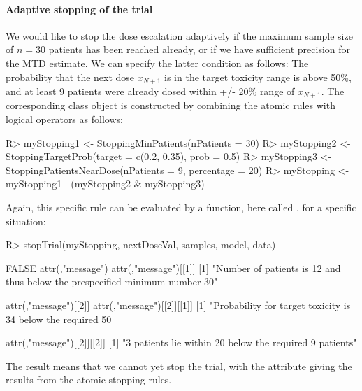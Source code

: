 \documentclass[article]{jss}\usepackage[]{graphicx}\usepackage[]{color}
\begin{document}
\paragraph{Adaptive stopping of the trial}
We would like to stop the dose escalation adaptively if the maximum sample size of $n=30$ patients
has been reached already, or if we have sufficient precision for the MTD estimate. We can specify the latter condition as follows: The probability that the next dose $x_{N+1}$ is in the target toxicity range is above 50\%, and at least 9 patients were already dosed within +/- 20\% range of $x_{N+1}$. The corresponding  class object is constructed by combining the atomic rules with logical operators as follows:
\begin{Schunk}
\begin{Sinput}
R> myStopping1 <- StoppingMinPatients(nPatients = 30)
R> myStopping2 <- StoppingTargetProb(target = c(0.2, 0.35), prob = 0.5)
R> myStopping3 <- StoppingPatientsNearDose(nPatients = 9, percentage = 20)
R> myStopping <- myStopping1 | (myStopping2 & myStopping3)
\end{Sinput}
\end{Schunk}
Again, this specific rule can be evaluated by a function, here called , for a specific situation:
\begin{Schunk}
\begin{Sinput}
R> stopTrial(myStopping, nextDoseVal, samples, model, data)
\end{Sinput}
\begin{Soutput}
[1] FALSE
attr(,"message")
attr(,"message")[[1]]
[1] "Number of patients is 12 and thus below the prespecified
minimum number 30"

attr(,"message")[[2]]
attr(,"message")[[2]][[1]]
[1] "Probability for target toxicity is 34 % for dose 100 and thus
below the required 50 %"

attr(,"message")[[2]][[2]]
[1] "3 patients lie within 20% of the next best dose 100. This is
below the required 9 patients" 
\end{Soutput}
\end{Schunk}
The result  means that we cannot yet stop the trial, with the attribute  giving the results from the atomic stopping rules.
\end{document}
